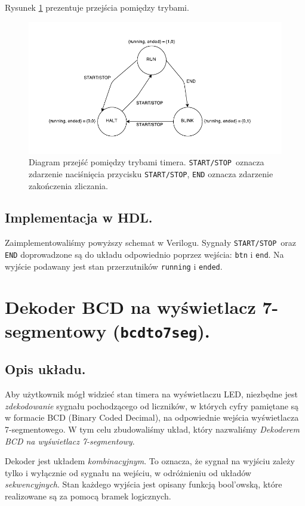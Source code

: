 \documentclass[a4paper,oneside]{report}
\newcommand{\startstop}{\texttt{START/STOP}}
\newcommand{\bcdtoseg}{\texttt{bcd\textunderscore to\textunderscore 7seg}}
\begin{document}
Rysunek \ref{state_diagram} prezentuje przejścia pomiędzy trybami.
\begin{figure}[htbp]
\centering
\includegraphics{state_diagram.pdf}
\caption[Diagram przejść pomiędzy trybami timera.]{Diagram przejść
pomiędzy trybami timera. \startstop\ oznacza zdarzenie naciśnięcia
przycisku \startstop , \texttt{END} oznacza zdarzenie zakończenia
zliczania.}
\label{state_diagram}
\end{figure}
\subsection{Implementacja w HDL.}
Zaimplementowaliśmy powyższy schemat w Verilogu. Sygnały
\startstop\ oraz \texttt{END} doprowadzone są do układu
odpowiednio poprzez wejścia: \texttt{btn} i
\texttt{end\textunderscore}. Na wyjście podawany jest stan
przerzutników \texttt{running} i \texttt{ended}.


\section{Dekoder BCD na wyświetlacz 7-segmentowy (\bcdtoseg).}
\subsection{Opis układu.}
Aby użytkownik mógł widzieć stan timera na wyświetlaczu LED,
niezbędne jest \emph{zdekodowanie} sygnału pochodzącego od
liczników, w których cyfry pamiętane są w formacie BCD (Binary
Coded Decimal), na odpowiednie wejścia wyświetlacza 7-segmentowego.
W tym celu zbudowaliśmy układ, który nazwaliśmy \emph{Dekoderem
BCD na wyświetlacz 7-segmentowy}.

Dekoder jest układem \emph{kombinacyjnym}. To oznacza, że sygnał na
wyjściu zależy tylko i wyłącznie od sygnału na wejściu, w
odróżnieniu od układów \emph{sekwencyjnych}. Stan każdego wyjścia
jest opisany funkcją bool'owską, które realizowane są za pomocą
bramek logicznych.
\end{document}

